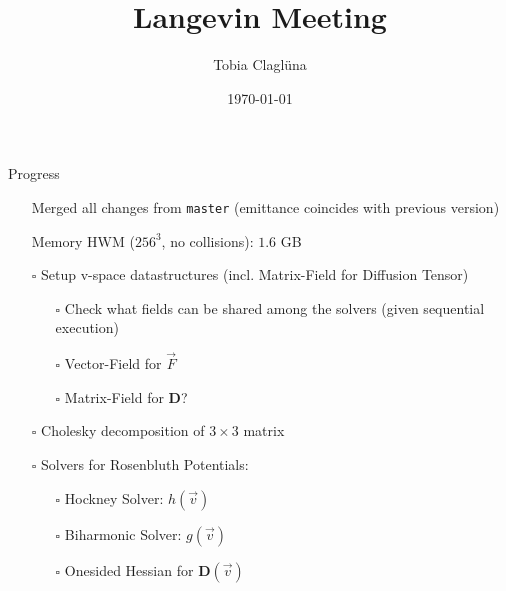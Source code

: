

\title[\today]{Langevin Meeting}

\author{Tobia Claglüna}
\date{\today}
\def \myEmail {tobia.clagluena@psi.ch}




\begin{frame}[c]{Progress}
    \begin{itemize}
        \item[\done]  Merged all changes from \texttt{master} (emittance coincides with previous version)
        \item[\done]  Memory HWM ($256^3$, no collisions): $1.6$ GB
        \item[$\square$] Setup v-space datastructures (incl. Matrix-Field for Diffusion Tensor)
        \begin{itemize}
            \item[$\square$] Check what fields can be shared among the solvers (given sequential execution)
            \item[$\square$] Vector-Field for $\vec{F}$
            \item[$\square$] Matrix-Field for $\boldsymbol{D}$?
        \end{itemize}
        \item[$\square$] Cholesky decomposition of $3\times3$ matrix
        \item[$\square$] Solvers for Rosenbluth Potentials:
        \begin{itemize}
            \item[$\square$] Hockney Solver: $h(\vec v)$
            \item[$\square$] Biharmonic Solver: $g(\vec v)$
            \item[$\square$] Onesided Hessian for $\boldsymbol D(\vec v)$
        \end{itemize}
    \end{itemize}
\end{frame}

